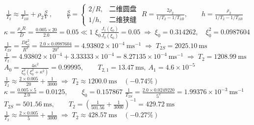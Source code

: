 \documentclass[border=3pt,multi=eqpage]{standalone}
\newenvironment{eqpage}{$\displaystyle}{$}
\begin{document}
\begin{eqpage}\boxed{\;\frac{1}{T_2}\approx\frac{1}{T_{2B}}+\rho_2\frac{S}{V}\;},\qquad \frac{S}{V}=\begin{cases}2/R, & \text{二维圆盘}\\ 1/h, & \text{二维狭缝}\end{cases}\end{eqpage}
\begin{eqpage}R=\frac{2\rho_2}{1/T_2-1/T_{2B}},\qquad h=\frac{\rho_2}{1/T_2-1/T_{2B}}\end{eqpage}
\begin{eqpage}\kappa=\frac{\rho_2R}{D}=\frac{0.005\times20}{2.0}=0.05\ll1\end{eqpage}
\begin{eqpage}\xi_0\frac{J_1(\xi_0)}{J_0(\xi_0)}=0.05\;\Longrightarrow\;\xi_0=0.314262,\quad \xi_0^2=0.0987604\end{eqpage}
\begin{eqpage}\frac{1}{T_{2S}}=\frac{D\xi_0^2}{R^2}=\frac{2.0\times0.0987604}{20^2}=4.93802\times10^{-4}\ \mathrm{ms^{-1}}\;\Longrightarrow\;T_{2S}=2025.10\ \mathrm{ms}\end{eqpage}
\begin{eqpage}\frac{1}{T_2}=4.93802\times10^{-4}+3.33333\times10^{-4}=8.27135\times10^{-4}\ \mathrm{ms^{-1}}\;\Longrightarrow\;T_2=1208.99\ \mathrm{ms}\end{eqpage}
\begin{eqpage}A_0=\frac{4\kappa^2}{\xi_0^2(\xi_0^2+\kappa^2)}=0.99995,\qquad T_{2,1}=13.47\ \mathrm{ms},\ A_1=4.6\times10^{-5}\end{eqpage}
\begin{eqpage}\frac{1}{T_2}\approx\frac{2\times0.005}{20}+\frac{1}{3000}\;\Longrightarrow\;T_2\approx1200.0\ \mathrm{ms}\quad(-0.74\%)\end{eqpage}
\begin{eqpage}\kappa=\frac{0.005\times5}{2.0}=0.0125,\qquad \xi_0=0.157867\end{eqpage}
\begin{eqpage}\frac{1}{T_{2S}}=\frac{2.0\times0.0249220}{5^2}=1.99376\times10^{-3}\ \mathrm{ms^{-1}}\end{eqpage}
\begin{eqpage}T_{2S}=501.56\ \mathrm{ms},\qquad T_2=\left(\frac{1}{501.56}+\frac{1}{3000}\right)^{-1}=429.72\ \mathrm{ms}\end{eqpage}
\begin{eqpage}\frac{1}{T_2}\approx\frac{2\times0.005}{5}+\frac{1}{3000}\;\Longrightarrow\;T_2\approx428.57\ \mathrm{ms}\quad(-0.27\%)\end{eqpage}
\end{document}
